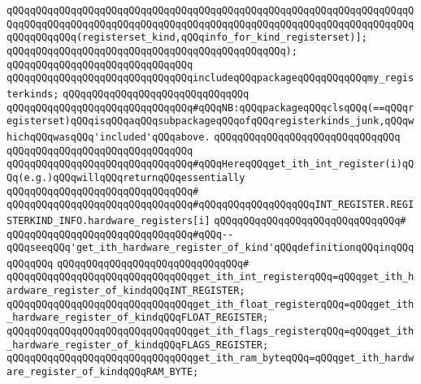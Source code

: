 \verb|qQQqqQQqqQQqqQQqqQQqqQQqqQQqqQQqqQQqqQQqqQQqqQQqqQQqqQQqqQQqqQQqqQQqqQQqqQQqqQQqqQQqqQQqqQQqqQQqqQQqqQQqqQQqqQQqqQQqqQQqqQQqqQQqqQQqqQQqqQQqqQQqqQQqqQQq(registerset_kind,qQQqinfo_for_kind_registerset)];|\newline
\verb|qQQqqQQqqQQqqQQqqQQqqQQqqQQqqQQqqQQqqQQqqQQqqQQq);|\newline
\verb|qQQqqQQqqQQqqQQqqQQqqQQqqQQqqQQq|\newline
\verb|qQQqqQQqqQQqqQQqqQQqqQQqqQQqqQQqincludeqQQqpackageqQQqqQQqqQQqmy_registerkinds;|\newline
\verb|qQQqqQQqqQQqqQQqqQQqqQQqqQQqqQQq|\newline
\verb|qQQqqQQqqQQqqQQqqQQqqQQqqQQqqQQq#qQQqNB:qQQqpackageqQQqclsqQQq(==qQQqregisterset)qQQqisqQQqaqQQqsubpackageqQQqofqQQqregisterkinds_junk,qQQqwhichqQQqwasqQQq'included'qQQqabove.|\newline
\verb|qQQqqQQqqQQqqQQqqQQqqQQqqQQqqQQq|\newline
\verb|qQQqqQQqqQQqqQQqqQQqqQQqqQQqqQQq|\newline
\verb|qQQqqQQqqQQqqQQqqQQqqQQqqQQqqQQq#qQQqHereqQQqget_ith_int_register(i)qQQq(e.g.)qQQqwillqQQqreturnqQQqessentially|\newline
\verb|qQQqqQQqqQQqqQQqqQQqqQQqqQQqqQQq#|\newline
\verb|qQQqqQQqqQQqqQQqqQQqqQQqqQQqqQQq#qQQqqQQqqQQqqQQqqQQqINT_REGISTER.REGISTERKIND_INFO.hardware_registers[i]|\newline
\verb|qQQqqQQqqQQqqQQqqQQqqQQqqQQqqQQq#|\newline
\verb|qQQqqQQqqQQqqQQqqQQqqQQqqQQqqQQq#qQQq--qQQqseeqQQq'get_ith_hardware_register_of_kind'qQQqdefinitionqQQqinqQQqqQQqqQQq|\newline
\verb|qQQqqQQqqQQqqQQqqQQqqQQqqQQqqQQq#|\newline
\verb|qQQqqQQqqQQqqQQqqQQqqQQqqQQqqQQqget_ith_int_registerqQQq=qQQqget_ith_hardware_register_of_kindqQQqINT_REGISTER;|\newline
\verb|qQQqqQQqqQQqqQQqqQQqqQQqqQQqqQQqget_ith_float_registerqQQq=qQQqget_ith_hardware_register_of_kindqQQqFLOAT_REGISTER;|\newline
\verb|qQQqqQQqqQQqqQQqqQQqqQQqqQQqqQQqget_ith_flags_registerqQQq=qQQqget_ith_hardware_register_of_kindqQQqFLAGS_REGISTER;|\newline
\verb|qQQqqQQqqQQqqQQqqQQqqQQqqQQqqQQqget_ith_ram_byteqQQq=qQQqget_ith_hardware_register_of_kindqQQqRAM_BYTE;|\newline
